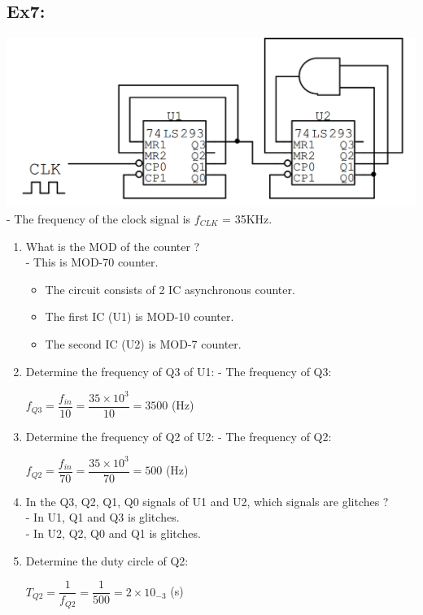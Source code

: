 \documentclass[12pt]{article}
\begin{document}
\subsection{Ex7:}
\includegraphics[scale = 0.7]{hinh1.png}
\bigbreak
- The frequency of the clock signal is $f_{CLK}$ = 35KHz. \\
\begin{enumerate}
	\item What is the MOD of the counter ? \\
	- This is MOD-70 counter.
	\begin{itemize}
		\item The circuit consists of 2 IC asynchronous counter.
		\item The first IC (U1) is MOD-10 counter.
		\item The second IC (U2) is MOD-7 counter.
	\end{itemize}
	\item Determine the frequency of Q3 of U1:
	- The frequency of Q3: \\
	\begin{center}
		$f_{Q3} = \dfrac{f_{in}}{10} = \dfrac{35 \times 10^{3}}{10} = 3500$ (Hz)
	\end{center}
	\item Determine the frequency of Q2 of U2:
	- The frequency of Q2: \\
	\begin{center}
		$f_{Q2} = \dfrac{f_{in}}{70} = \dfrac{35 \times 10^{3}}{70} = 500$ (Hz)
	\end{center}
	\item In the Q3, Q2, Q1, Q0 signals of U1 and U2, which signals are glitches ? \\
	- In U1, Q1 and Q3 is glitches. \\
	- In U2, Q2, Q0 and Q1 is glitches. \\
	\item Determine the duty circle of Q2: \\
	\begin{center}
		$T_{Q2} = \dfrac{1}{f_{Q2}} = \dfrac{1}{500} = 2 \times 10_{-3}$ (s)
	\end{center}
\end{enumerate}
\end{document}
